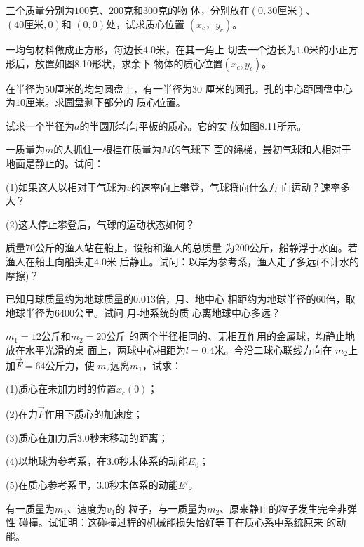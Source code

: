 \begin{exercises}

\exercise 三个质量分别为$ 100 $克、$ 200 $克和$ 300 $克的物
体，分别放在$ \left(0, 30 \text {厘米} \right) $、
$ \left(40 \text{厘米}, 0 \right) $和
$ \left(0, 0 \right) $处，试求质心位置
$ \left( x _ { c } ， y _ { c } \right) $。

\exercise 一均匀材料做成正方形，每边长$ 4.0 $米，在其一角上
切去一个边长为$ 1.0 $米的小正方形后，放置如图8.10形状，求余下
物体的质心位置$ \left( x _ { c } , y _ { c } \right) $。

\exercise 在半径为$ 50 $厘米的均匀圆盘上，有一半径为$ 30 $
厘米的圆孔，孔的中心距圆盘中心为$ 10 $厘米。求圆盘剩下部分的
质心位置。

\exercise 试求一个半径为$ a $的半圆形均匀平板的质心。它的安
放如图8.11所示。

\exercise 一质量为$ m $的人抓住一根挂在质量为$ M $的气球下
面的绳梯，最初气球和人相对于地面是静止的。试问：

(1)如果这人以相对于气球为$ v $的速率向上攀登，气球将向什么方
向运动？速率多大？

(2)这人停止攀登后，气球的运动状态如何？

\exercise 质量$ 70 $公斤的渔人站在船上，设船和渔人的总质量
为$ 200 $公斤，船静浮于水面。若渔人在船上向船头走$ 4.0 $米
后静止。试问：以岸为参考系，渔人走了多远(不计水的摩擦)？

\exercise 已知月球质量约为地球质量的$ 0.013 $倍，月、地中心
相距约为地球半径的$ 60 $倍，取地球半径为$ 6400 $公里。试问
月-地系统的质
心离地球中心多远？

\exercise \;$ m _ { 1 } = 12 $公斤和$ m _ { 2 } = 20 $公斤
的两个半径相同的、无相互作用的金属球，均静止地放在水平光滑的桌
面上，两球中心相距为$ l = 0.4 $米。今沿二球心联线方向在
$ m _ { 2 } $上加$ \vec { F } = 64 $公斤力，使
$ m _ { 2 } $远离$ m _ { 1 } $，试求：

(1)质心在未加力时的位置$ x _ { c } \left( 0 \right) $；

(2)在力$ \vec { F } $作用下质心的加速度；

(3)质心在加力后$ 3.0 $秒末移动的距离；

(4)以地球为参考系，在$ 3.0 $秒末体系的动能$ E _ { 0 } $；

(5)在质心参考系里，$ 3.0 $秒末体系的动能$ E ' $。

\exercise 有一质量为$ m _  { 1 } $、速度为$ v _ { 1 } $的
粒子，与一质量为$ m _  { 2 } $、原来静止的粒子发生完全非弹性
碰撞。试证明：这碰撞过程的机械能损失恰好等于在质心系中系统原来
的动能。


\end{exercises}

